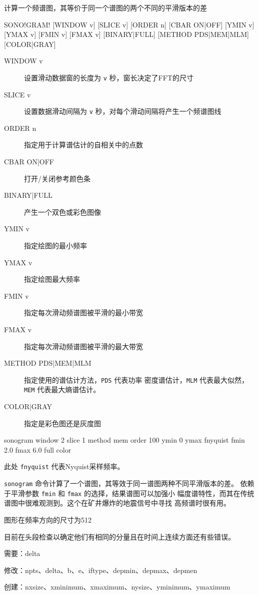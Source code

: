\label{cmd:sonogram}

计算一个频谱图，其等价于同一个谱图的两个不同的平滑版本的差

\begin{SACSTX}
SONO!GRAM! [WINDOW v] [SLICE v] [ORDER n] [CBAR ON|OFF] [YMIN v] [YMAX v]
    [FMIN v] [FMAX v] [BINARY|FULL] [METHOD PDS|MEM|MLM] [COLOR|GRAY]
\end{SACSTX}

\begin{description}
\item [WINDOW v] 设置滑动数据窗的长度为 \texttt{v} 秒，窗长决定了FFT的尺寸
\item [SLICE v] 设置数据滑动间隔为 \texttt{v} 秒，对每个滑动间隔将产生一个频谱图线
\item [ORDER n] 指定用于计算谱估计的自相关中的点数
\item [CBAR ON|OFF] 打开/关闭参考颜色条
\item [BINARY|FULL] 产生一个双色或彩色图像
\item [YMIN v] 指定绘图的最小频率
\item [YMAX v] 指定绘图最大频率
\item [FMIN v] 指定每次滑动频谱图被平滑的最小带宽
\item [FMAX v] 指定每次滑动频谱图被平滑的最大带宽
\item [METHOD PDS|MEM|MLM] 指定使用的谱估计方法，\texttt{PDS} 代表功率
    密度谱估计，\texttt{MLM} 代表最大似然，\texttt{MEM} 代表最大熵谱估计。
\item [COLOR|GRAY] 指定是彩色图还是灰度图
\end{description}

\begin{SACDFT}
sonogram window 2 slice 1 method mem order 100 ymin 0 ymax fnyquist
    fmin 2.0 fmax 6.0 full color
\end{SACDFT}
此处 \texttt{fnyquist} 代表Nyquist采样频率。

\texttt{sonogram} 命令计算了一个谱图，其等效于同一谱图两种不同平滑版本的差。
依赖于平滑参数 \texttt{fmin} 和 \texttt{fmax} 的选择，结果谱图可以加强小
幅度谱特性，而其在传统谱图中很难观测到。这个在矿井爆炸的地震信号中寻找
高频谱时很有用。

图形在频率方向的尺寸为512

目前在头段检查以确定他们有相同的分量且在时间上连续方面还有些错误。

需要：delta

修改：npts、delta、b、e、iftype、depmin、depmax、depmen

创建：nxsize、xminimum、xmaximum、nysize、yminimum、ymaximum
